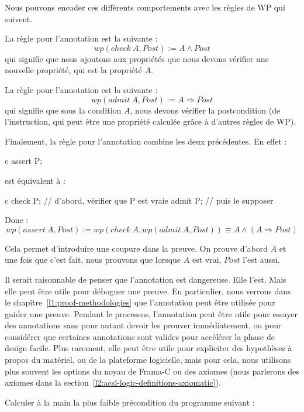 Nous pouvons encoder ces différents comportements avec les règles de WP qui
suivent.


La règle pour l'annotation  est la suivante :
$$ wp(check\ A, Post) := A \wedge Post $$
qui signifie que nous ajoutons aux propriétés que nous devons vérifier une
nouvelle propriété, qui est la propriété $A$.


La règle pour l'annotation  est la suivante :
$$ wp(admit\ A, Post) := A \Rightarrow Post $$
qui signifie que sous la condition $A$, nous devons vérifier la postcondition
(de l'instruction, qui peut être une propriété calculée grâce à d'autres règles
de WP).


Finalement, la règle pour l'annotation  combine les deux
précédentes. En effet :
\begin{CodeBlock}{c}
  assert P;
\end{CodeBlock}
est équivalent à :
\begin{CodeBlock}{c}
  check P; // d'abord, vérifier que P est vraie
  admit P; // puis le supposer
\end{CodeBlock}
Donc :
$$ wp(assert\ A, Post) := wp(check\ A, wp(admit\ A, Post)) \equiv A \wedge (A \Rightarrow Post) $$


Cela permet d'introduire une coupure dans la preuve. On prouve d'abord $A$ et
une fois que c'est fait, nous prouvons que lorsque $A$ est vrai, $Post$ l'est
aussi.


Il serait raisonnable de penser que l'annotation  est
dangereuse. Elle l'est. Mais elle peut être utile pour déboguer une preuve.
En particulier, nous verrons dans le chapitre~\ref{l1:proof-methodologies} que
l'annotation  peut être utilisée pour guider une preuve.
Pendant le processus, l'annotation  peut être utile pour
essayer des annotations sans pour autant devoir les prouver immédiatement, ou
pour considérer que certaines annotations sont valides pour accélérer la phase
de design facile. Plus rarement, elle peut être utile pour expliciter des
hypothèses à propos du matériel, ou de la plateforme logicielle, mais pour cela,
nous utilisons plus souvent les options du noyau de Frama-C ou des axiomes
(nous parlerons des axiomes dans la section~\ref{l2:acsl-logic-definitions-axiomatic}).






Calculer à la main la plus faible précondition du programme suivant :


